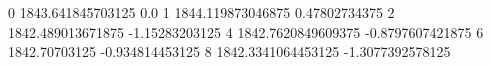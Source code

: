 0 1843.641845703125 0.0
1 1844.119873046875 0.47802734375
2 1842.489013671875 -1.15283203125
4 1842.7620849609375 -0.8797607421875
6 1842.70703125 -0.934814453125
8 1842.3341064453125 -1.3077392578125
